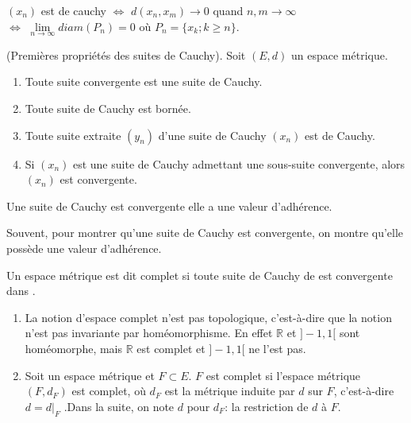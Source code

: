 \documentclass[12pt,a4paper]{article}
\begin{document}
\begin{flushleft}
\begin{rem}
$(x_n)$ est de cauchy $\Leftrightarrow$ $d(x_n, x_m) \longrightarrow 0$ quand $n,m \longrightarrow \infty$\\$\Leftrightarrow$ $\lim\limits_{n \rightarrow \infty} diam (P_n) = 0$ où $P_n =  \{x_k ; k \geq n\}$.
\end{rem}

\begin{prop}
(Premières propriétés des suites de Cauchy). Soit $(E,d)$ un espace métrique.
\begin{enumerate}
\item Toute suite convergente est une suite de Cauchy.
\item Toute suite de Cauchy est bornée.
\item Toute suite extraite $(y_n)$ d'une suite de Cauchy $(x_n)$ est de Cauchy.
\item Si $(x_n)$ est une suite de Cauchy admettant une sous-suite convergente, alors $(x_n)$ est convergente.
\end{enumerate}
\end{prop}

\begin{cor}
Une suite de Cauchy est convergente \ssi elle a une valeur d'adhérence.
\end{cor}


\begin{rem} 
Souvent, pour montrer qu'une suite de Cauchy est convergente, on montre qu'elle possède une valeur d'adhérence.
\end{rem}

\begin{mydef} 
Un espace métrique \edm est dit complet si toute suite de Cauchy de \edm est convergente dans \edm.
\end{mydef}

\begin{rem} 
\begin{enumerate}
\item La notion d'espace complet n'est pas topologique, c'est-à-dire que la notion n'est pas invariante par homéomorphisme. En effet $\mathbb{R}$ et $]-1,1[$ sont homéomorphe, mais $\mathbb{R}$ est complet et  $]-1,1[$ ne l'est pas.
\item Soit \edm un espace métrique et $F \subset E$. $F$ est complet si l'espace métrique $(F, d_F)$ est complet, où $d_F$ est la métrique induite par $d$ sur $F$, c'est-à-dire $d = d|_F$ .Dans la suite, on note $d$ pour $d_F$: la restriction de $d$ à $F$.
\end{enumerate}
\end{rem}


\end{flushleft}
\end{document}
